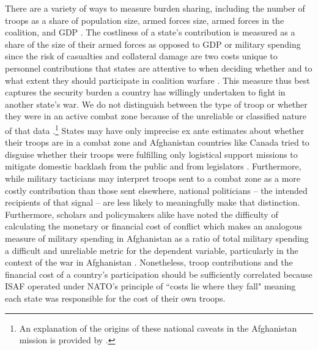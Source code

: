 \documentclass[12pt,letterpaper]{article}
\begin{document}
		There are a variety of ways to measure burden sharing, including the number of troops as a share of population size, armed forces size, armed forces in the coalition, and GDP \citep[668-669]{hartley_natoburdensharingfuture_1999}. The costliness of a state's contribution is measured as a share of the size of their armed forces as opposed to GDP or military spending since the risk of casualties and collateral damage are two costs unique to personnel contributions that states are attentive to when deciding whether and to what extent they should participate in coalition warfare \citep{ringsmose_natoburdensharingredux_2010, chivvis_topplingqaddafilibya_2014, vonhlatky_cashcombatamerica_2015, haesebrouck_natoburdensharing_2017}. This measure thus best captures the security burden a country has willingly undertaken to fight in another state's war. We do not distinguish between the type of troop or whether they were in an active combat zone because of the unreliable or classified nature of that data \citep[44-45]{bogers_missionafghanistanwho_2013}.\footnote{An explanation of the origins of these national caveats in the Afghanistan mission is provided by \citep{saideman_comparingcaveatsunderstanding_2012}.} States may have only imprecise ex ante estimates about whether their troops are in a combat zone and Afghanistan countries like Canada tried to disguise whether their troops were fulfilling only logistical support missions to mitigate domestic backlash from the public and from legislators \citep{reportprogresssecurity_2010}. Furthermore, while military tacticians may interpret troops sent to a combat zone as a more costly contribution than those sent elsewhere, national politicians -- the intended recipients of that signal -- are less likely to meaningfully make that distinction. Furthermore, scholars and policymakers alike have noted the difficulty of calculating the monetary or financial cost of conflict \citep{stiglitz_estimatingcostswar_2012} which makes an analogous measure of military spending in Afghanistan as a ratio of total military spending a difficult and unreliable metric for the dependent variable, particularly in the context of the war in Afghanistan \citep{bruck_economiccostsgerman_2011}. Nonetheless, troop contributions and the financial cost of a country's participation should be sufficiently correlated because ISAF operated under NATO's principle of ``costs lie where they fall" meaning each state was responsible for the cost of their own troops.
\end{document}
